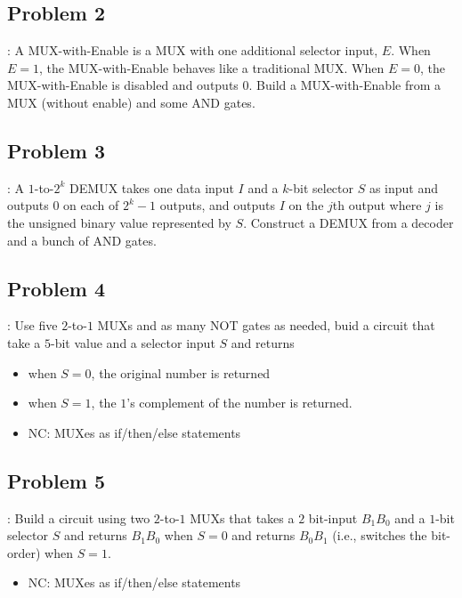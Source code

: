\documentclass{../slides}
\begin{document}
\subsection{Problem 2}
\begin{frame}{\secname: \subsecname}
    A MUX-with-Enable is a MUX with one additional selector input, $E$. When $E = 1$, the MUX-with-Enable behaves like a traditional MUX. When $E = 0$, the MUX-with-Enable is disabled and outputs $0$. Build a MUX-with-Enable from a MUX (without enable) and some AND gates.
\end{frame}

\subsection{Problem 3}
\begin{frame}{\secname: \subsecname}
    A $1$-to-$2^k$ DEMUX takes one data input $I$ and a $k$-bit selector $S$ as input and outputs $0$ on each of $2^k -1$ outputs, and outputs $I$ on the $j$th output where $j$ is the unsigned binary value represented by $S$. Construct a DEMUX from a decoder and a bunch of AND gates.
\end{frame}

\subsection{Problem 4}
\begin{frame}{\secname: \subsecname}
    Use five $2$-to-$1$ MUXs and as many NOT gates as needed, buid a circuit that take a $5$-bit value and a selector input $S$ and returns
    \begin{itemize}
        \item when $S = 0$, the original number is returned
        \item when $S = 1$, the $1$'s complement of the number is returned.
    \end{itemize}
    \begin{itemize}
        \item NC: MUXes as if/then/else statements
    \end{itemize}
\end{frame}

\subsection{Problem 5}
\begin{frame}{\secname: \subsecname}
    Build a circuit using two $2$-to-$1$ MUXs that takes a $2$ bit-input $B_1B_0$ and a $1$-bit selector $S$ and returns $B_1B_0$ when $S = 0$ and returns $B_0B_1$ (i.e., switches the bit-order) when $S = 1$.
    \begin{itemize}
        \item NC: MUXes as if/then/else statements
    \end{itemize}
\end{frame}
\end{document}
